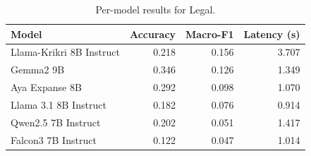 \begin{table}[t]
\centering
\caption{Per-model results for Legal.}
\label{tab:appendix-legal-classification-analysis}
\begin{tabular}{lrrr}
\toprule
Model & Accuracy & Macro-F1 & Latency (s) \\
\midrule
Llama-Krikri 8B Instruct & 0.218 & 0.156 & 3.707 \\
Gemma2 9B & 0.346 & 0.126 & 1.349 \\
Aya Expanse 8B & 0.292 & 0.098 & 1.070 \\
Llama 3.1 8B Instruct & 0.182 & 0.076 & 0.914 \\
Qwen2.5 7B Instruct & 0.202 & 0.051 & 1.417 \\
Falcon3 7B Instruct & 0.122 & 0.047 & 1.014 \\
\bottomrule
\end{tabular}
\end{table}
